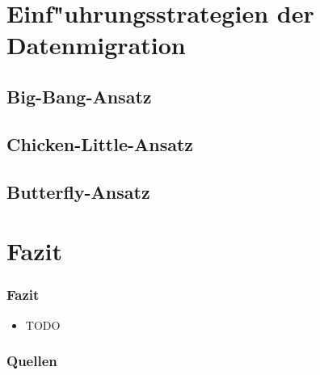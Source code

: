 \documentclass{beamer}
\begin{document}
	\section{Einf"uhrungsstrategien der Datenmigration}
	
	\subsection{Big-Bang-Ansatz}
	
	
	\subsection{Chicken-Little-Ansatz}
	
	
	\subsection{Butterfly-Ansatz}
	
	
	\section{Fazit}
	
	\begin{frame}
		\frametitle{Fazit}
		
		\begin{itemize}
			\item TODO %
		\end{itemize}
	\end{frame}
	
	
	
	\begin{frame}
		\frametitle{Quellen}
						
		
		
	\end{frame}
	
\end{document}
